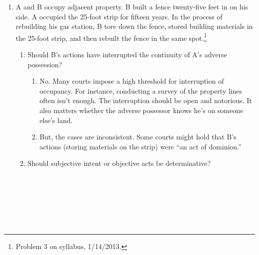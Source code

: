 \begin{enumerate}
    \item A and B occupy adjacent property. B built a fence twenty-five feet 
    in on his side. A occupied the 25-foot strip for fifteen years. In the 
    process of rebuilding his gas station, B tore down the fence, stored 
    building materials in the 25-foot strip, and then rebuilt the fence in the 
    same spot.\footnote{Problem 3 on syllabus, 1/14/2013.}
    \begin{enumerate}
        \item Should B's actions have interrupted the continuity of A's 
        adverse possession?
        \begin{enumerate}
            \item No. Many courts impose a high threshold for interruption of 
            occupancy. For instance, conducting a survey of the property lines 
            often isn't enough. The interruption should be open and notorious. 
            It also matters whether the adverse possessor knows he's on 
            someone else's land.
            \item But, the cases are inconsistent. Some courts might hold that 
            B's actions (storing materials on the strip) were ``an act of 
            dominion.''
        \end{enumerate}
        \item Should subjective intent or objective acts be determinative?
        ~\\\\\\\\\\\\\\%
    \end{enumerate}
\end{enumerate}



